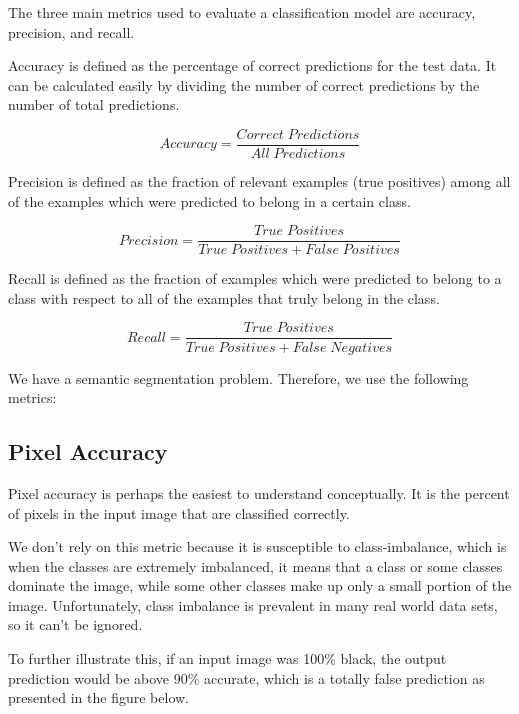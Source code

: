 The three main metrics used to evaluate a classification model are accuracy, precision, and recall.

Accuracy is defined as the percentage of correct predictions for the test data. It can be calculated easily by dividing the number of correct predictions by the number of total predictions.

\begin{equation}
  Accuracy = \frac{Correct\; Predictions}{All\; Predictions}
\end{equation}

Precision is defined as the fraction of relevant examples (true positives) among all of the examples which were predicted to belong in a certain class.

\begin{equation}
  Precision = \frac{True\; Positives}{True\; Positives + False\; Positives}
\end{equation}

Recall is defined as the fraction of examples which were predicted to belong to a class with respect to all of the examples that truly belong in the class.

\begin{equation}
  Recall = \frac{True\; Positives}{True\; Positives + False\; Negatives}
\end{equation}

We have a semantic segmentation problem. Therefore, we use the following metrics:

\subsection{Pixel Accuracy}
\hspace{\parindent}
Pixel accuracy is perhaps the easiest to understand conceptually. It is the percent of pixels in the input image that are classified correctly.\

We don't rely on this metric because it is susceptible to class-imbalance, which is when the classes are extremely imbalanced, it means that a class or some classes dominate the image, while some other classes make up only a small portion of the image. Unfortunately, class imbalance is prevalent in many real world data sets, so it can’t be ignored.\

To further illustrate this, if an input image was 100\% black, the output prediction would be above 90\% accurate, which is a totally false prediction as presented in the figure below.

